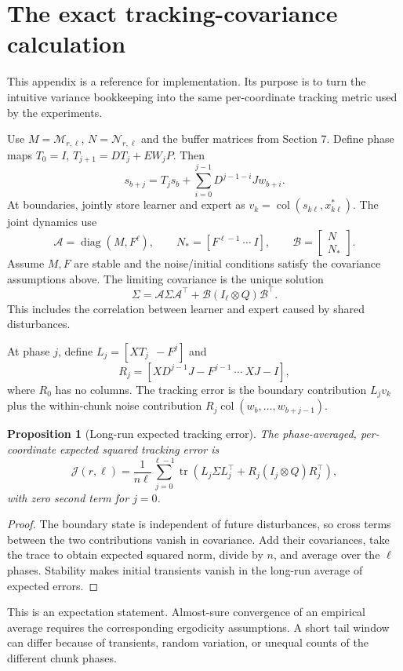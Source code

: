 \documentclass[12 pt]{article}        	%
\newtheorem{proposition}[theorem]{Proposition}
\theoremstyle{definition}
\DeclareMathOperator{\tr}{tr}
\DeclareMathOperator{\diag}{diag}
\begin{document}
\appendix
\section{The exact tracking-covariance calculation}\label{app:covariance}
This appendix is a reference for implementation. Its purpose is to turn the intuitive variance bookkeeping into the same per-coordinate tracking metric used by the experiments.

Use $M=\mathcal M_{r,\ell}$, $N=\mathcal N_{r,\ell}$ and the buffer matrices from Section 7. Define phase maps $T_0=I$, $T_{j+1}=DT_j+EW_jP$. Then
\[
s_{b+j}=T_js_b+\sum_{i=0}^{j-1}D^{j-1-i}Jw_{b+i}.
\]
At boundaries, jointly store learner and expert as $v_k=\operatorname{col}(s_{k\ell},x^*_{k\ell})$. The joint dynamics use
\[
\mathcal A=\diag(M,F^\ell),\qquad
N_*=[F^{\ell-1}\ \cdots\ I],\qquad
\mathcal B=\begin{bmatrix}N\\N_*\end{bmatrix}.
\]
Assume $M,F$ are stable and the noise/initial conditions satisfy the covariance assumptions above. The limiting covariance is the unique solution
\[
\Sigma=\mathcal A\Sigma\mathcal A^\top+
\mathcal B(I_\ell\otimes Q)\mathcal B^\top.
\]
This includes the correlation between learner and expert caused by shared disturbances.

At phase $j$, define $L_j=[XT_j\ \ -F^j]$ and
\[
R_j=[XD^{j-1}J-F^{j-1}\ \cdots\ XJ-I],
\]
where $R_0$ has no columns. The tracking error is the boundary contribution $L_jv_k$ plus the within-chunk noise contribution $R_j\operatorname{col}(w_b,\ldots,w_{b+j-1})$.
\begin{proposition}[Long-run expected tracking error]
The phase-averaged, per-coordinate expected squared tracking error is
\[
\mathcal J(r,\ell)=\frac{1}{n\ell}\sum_{j=0}^{\ell-1}
\tr\left(L_j\Sigma L_j^\top+R_j(I_j\otimes Q)R_j^\top\right),
\]
with zero second term for $j=0$.
\end{proposition}
\begin{proof}
The boundary state is independent of future disturbances, so cross terms between the two contributions vanish in covariance. Add their covariances, take the trace to obtain expected squared norm, divide by $n$, and average over the $\ell$ phases. Stability makes initial transients vanish in the long-run average of expected errors.
\end{proof}
This is an expectation statement. Almost-sure convergence of an empirical average requires the corresponding ergodicity assumptions. A short tail window can differ because of transients, random variation, or unequal counts of the different chunk phases.
\end{document}
